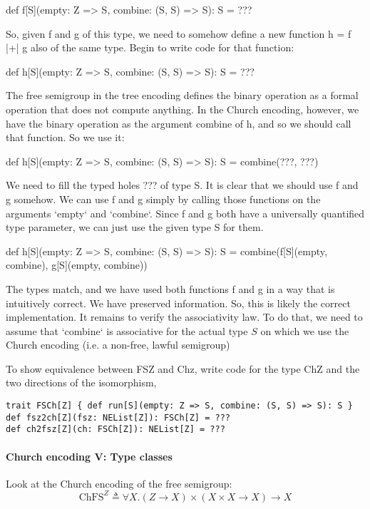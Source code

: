 def f{[}S{]}(empty: Z => S, combine: (S, S) => S): S = ???

So, given f and g of this type, we need to somehow define a new function
h = f |+| g also of the same type. Begin to write code for that function:

def h{[}S{]}(empty: Z => S, combine: (S, S) => S): S = ???

The free semigroup in the tree encoding defines the binary operation
as a formal operation that does not compute anything. In the Church
encoding, however, we have the binary operation as the argument \textquotedbl combine\textquotedbl{}
of h, and so we should call that function. So we use it:

def h{[}S{]}(empty: Z => S, combine: (S, S) => S): S = combine(???,
???)

We need to fill the typed holes ??? of type S. It is clear that we
should use f and g somehow. We can use f and g simply by calling those
functions on the arguments `empty` and `combine`. Since f and g both
have a universally quantified type parameter, we can just use the
given type S for them.

def h{[}S{]}(empty: Z => S, combine: (S, S) => S): S = combine(f{[}S{]}(empty,
combine), g{[}S{]}(empty, combine))

The types match, and we have used both functions f and g in a way
that is intuitively correct. We have preserved information. So, this
is likely the correct implementation. It remains to verify the associativity
law. To do that, we need to assume that `combine` is associative for
the actual type $S$ on which we use the Church encoding (i.e. a non-free,
lawful semigroup)

To show equivalence between FSZ and Chz, write code for the type ChZ
and the two directions of the isomorphism,
\begin{lstlisting}
trait FSCh[Z] { def run[S](empty: Z => S, combine: (S, S) => S): S }
def fsz2ch[Z](fsz: NEList[Z]): FSCh[Z] = ???
def ch2fsz[Z](ch: FSCh[Z]): NEList[Z] = ???
\end{lstlisting}

\paragraph{Church encoding V: Type classes}

Look at the Church encoding of the free semigroup:{\footnotesize{}
\[
\text{ChFS}^{Z}\triangleq\forall X.\left(Z\rightarrow X\right)\times\left(X\times X\rightarrow X\right)\rightarrow X
\]
}{\footnotesize\par}

